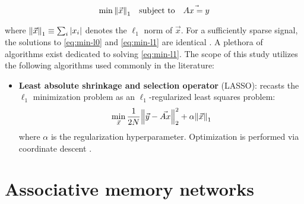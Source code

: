 \begin{equation}\label{eq:min-l1}
	\min \norm{\vec{x}}_1 \quad \textrm{subject to} \quad \vec{Ax = y}
\end{equation}

\noindent where $\norm{\vec{x}}_1 \equiv \sum_i \abs{x_i}$ denotes the $\ell_1$ norm of $\vec{x}$. For a sufficiently sparse signal, the solutions to \eqref{eq:min-l0} and \eqref{eq:min-l1} are identical \cite{Candes2006a}. A plethora of algorithms exist dedicated to solving \eqref{eq:min-l1}. The scope of this study utilizes the following algorithms used commonly in the literature:

\begin{itemize}
	\item \textbf{Least absolute shrinkage and selection operator} (LASSO): recasts the $\ell_1$ minimization problem as an $\ell_1$-regularized least squares problem:
	\begin{equation}
		\min_{\vec{x}} \frac{1}{2N} \norm{\vec{y} - \vec{Ax}}_2^2 + \alpha \norm{\vec{x}}_1
	\end{equation}
	where $\alpha$ is the regularization hyperparameter. Optimization is performed via coordinate descent \cite{scikit-learn}.
\end{itemize}


\section{Associative memory networks}
\label{sec:amnn}